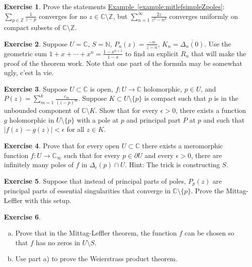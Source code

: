 \documentclass[12pt,openany]{book}
\newcommand{\sabs}[1]{\lvert {#1} \rvert}
\newcommand{\C}{{\mathbb{C}}}
\newcommand{\Z}{{\mathbb{Z}}}
\newcommand{\N}{{\mathbb{N}}}
\theoremstyle{plain}
\theoremstyle{remark}
\theoremstyle{definition}
\newenvironment{exbox}{%
    \def\FrameCommand{\vrule width 1pt \relax\hspace{10pt}}%
    \MakeFramed{\advance\hsize-\width\FrameRestore}%
}{%
    \endMakeFramed
}
\newenvironment{exparts}{%
    \leavevmode\begin{enumerate}[a),noitemsep,topsep=0pt,parsep=0pt,partopsep=0pt]
}{%
    \end{enumerate}
}
\theoremstyle{exercise}
\newtheorem{exercise}{Exercise}[section]
\theoremstyle{example}
\newcommand{\exampleref}[1]{\hyperref[#1]{Example~\ref*{#1}}}
\begin{document}
\begin{exbox}
\begin{exercise} \label{exercise:mitlefsimpleZpoles}
Prove the statements \exampleref{example:mitlefsimpleZpoles}:
$\sum_{p\in \Z} \frac{1}{z-p}$
converges for no $z \in \C \setminus \Z$, but
$\sum_{n=1}^\infty
\frac{2z}{z^2-n^2}$
converges uniformly on compact subsets of $\C \setminus \Z$.
\end{exercise}

\begin{exercise}\label{exercise:mitlefsimpleNpoles}
Suppose $U = \C$, $S = \N$, $P_n(z) = \frac{-n}{z-n}$, $K_n =
\overline{\Delta_n(0)}$.  Use the geometric sum $1+x+\cdots+x^n =
\frac{1-x^{n+1}}{1-x}$ to find an explicit $R_n$ that will make the proof
of the theorem work.
Note that one part of the formula may be somewhat ugly, c'est la vie.
\end{exercise}

\begin{exercise}
Suppose $U \subset \C$ is open, $f \colon U \to \C$ holomorphic,
$p \in U$, and
$P(z) = \sum_{m=1}^{k} \frac{c_m}{{(z-p)}^m}$.
Suppose
$K \subset U \setminus \{ p \}$ is compact such that $p$ is in the unbounded
component of $\C \setminus K$.  Show that for every $\epsilon > 0$,
there exists a function $g$ holomorphic in $U \setminus \{ p \}$
with a pole at $p$ and principal part $P$ at $p$ and such that
$\sabs{f(z)-g(z)} < \epsilon$ for all $z \in K$.
\end{exercise}

\begin{exercise}
Prove that for every open $U \subset \C$ there exists a meromorphic function
$f \colon U \to \C_\infty$ such that for every $p \in \partial U$
and every $\epsilon > 0$, there are infinitely many poles of $f$ in
$\Delta_{\epsilon}(p) \cap U$.  Hint: The trick is constructing $S$.
\end{exercise}

\begin{exercise}
Suppose that instead of principal parts of poles, $P_p(z)$ are principal
parts of essential singularities that converge in $\C \setminus \{ p \}$.
Prove the Mittag-Leffler with this setup.
\end{exercise}

\begin{exercise}
\begin{exparts}
\item
Prove that in the Mittag-Leffler theorem, the function $f$ can be chosen
so that $f$ has no zeros in $U \setminus S$.
\item
Use part a) to prove the Weierstrass product theorem.
\end{exparts}
\end{exercise}
\end{exbox}
\end{document}
